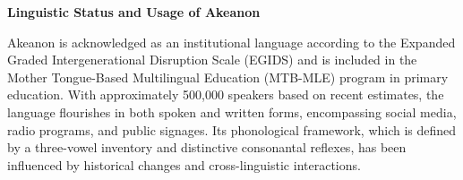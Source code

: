 \begin{table}[H]
   \centering
   \caption{Updated Consonant Inventory for Akeanon} \vspace{0.25em}
   \label{tab:consonant_inventory}
   \renewcommand{\arraystretch}{1.2} %
   \setlength{\tabcolsep}{5pt} %


\end{table}


\textbf{Linguistic Status and Usage of Akeanon }
 
Akeanon is acknowledged as an institutional language according to the Expanded Graded Intergenerational Disruption Scale (EGIDS) and is included in the Mother Tongue-Based Multilingual Education (MTB-MLE) program in primary education. With approximately 500,000 speakers based on recent estimates, the language flourishes in both spoken and written forms, encompassing social media, radio programs, and public signages. Its phonological framework, which is defined by a three-vowel inventory and distinctive consonantal reflexes, has been influenced by historical changes and cross-linguistic interactions.


